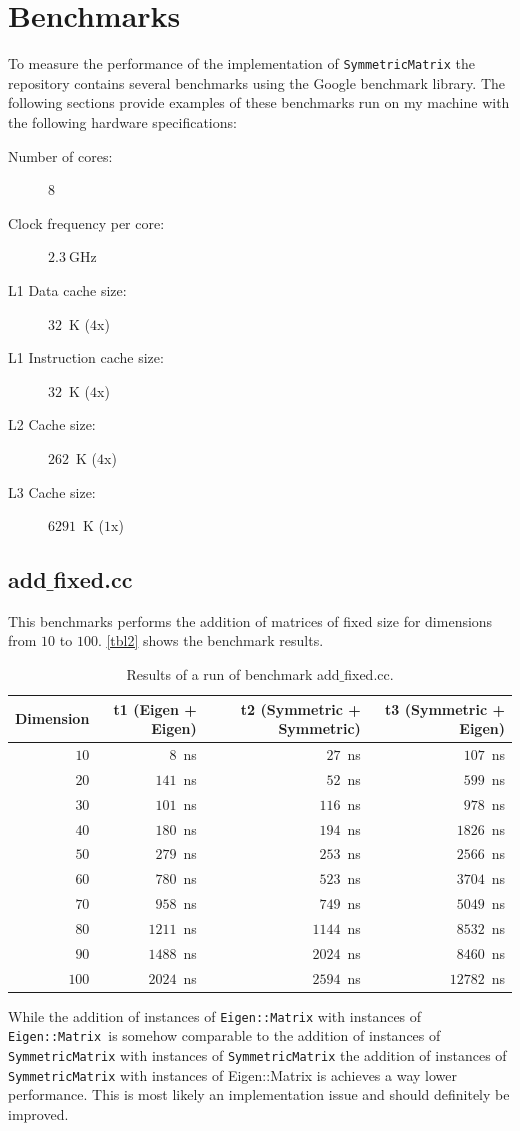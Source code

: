 \documentclass[a4wide]{scrartcl}
\begin{document}
\section{Benchmarks}
To measure the performance of the implementation of \texttt{SymmetricMatrix} the repository contains several benchmarks using the Google benchmark library. The following sections provide examples of these benchmarks run on my machine with the following hardware specifications:
\begin{description}
\item[Number of cores:]$8$
\item[Clock frequency per core:]$2.3~$GHz
\item[L1 Data cache size:]$32$~K ($4$x)
\item[L1 Instruction cache size:]$32$~K ($4$x)
\item[L2 Cache size:]$262$~K ($4$x)
\item[L3 Cache size:]$6291$~K ($1$x)
\end{description}

\subsection{add$\_$fixed.cc}
This benchmarks performs the addition of matrices of fixed size for dimensions from $10$ to $100$. \autoref{tbl2} shows the benchmark results.
\begin{table}
    \centering
\begin{tabular}{r|r|r|r}
    Dimension & t1 (Eigen + Eigen)  & t2 (Symmetric + Symmetric) & t3 (Symmetric + Eigen)  \\ \hline \hline
    $10$  & $8$~ns & $27$~ns & $107$~ns\\
    $20$  & $141$~ns & $52$~ns & $599$~ns\\
    $30$  & $101$~ns & $116$~ns & $978$~ns\\
    $40$  & $180$~ns & $194$~ns & $1826$~ns\\
    $50$  & $279$~ns & $253$~ns & $2566$~ns\\
    $60$  & $780$~ns & $523$~ns & $3704$~ns\\
    $70$  & $958$~ns & $749$~ns & $5049$~ns \\
    $80$  & $1211$~ns & $1144$~ns & $8532$~ns \\
    $90$  & $1488$~ns & $2024$~ns & $8460$~ns\\
    $100$ & $2024$~ns & $2594$~ns & $12782$~ns
    \end{tabular}
    \caption{Results of a run of benchmark add$\_$fixed.cc.}
    \label{tbl2}
\end{table}
While the addition of instances of \texttt{Eigen::Matrix} with instances of \texttt{Eigen::Matrix }is somehow comparable to the addition of instances of \texttt{SymmetricMatrix} with instances of \texttt{SymmetricMatrix} the addition of instances of \texttt{SymmetricMatrix} with instances of Eigen::Matrix is achieves a way lower performance. This is most likely an implementation issue and should definitely be improved.
\end{document}
